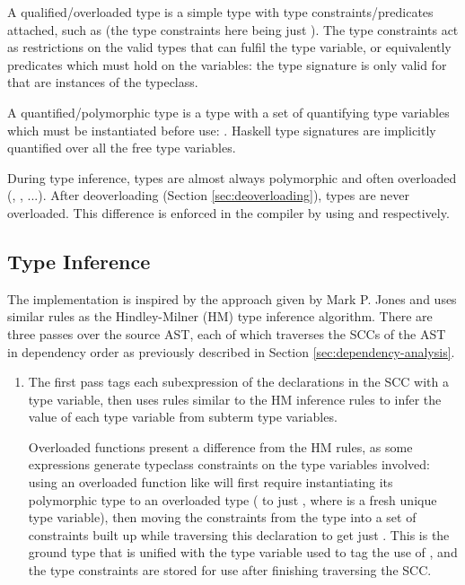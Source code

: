 \documentclass[dissertation.tex]{subfiles}
\begin{document}
{{        A qualified/overloaded type is a simple type with type constraints/predicates attached, such as  (the type constraints here being just ). The type constraints act as restrictions on the valid types that can fulfil the type variable, or equivalently predicates which must hold on the variables: the type signature is only valid for  that are instances of the  typeclass. 

        A quantified/polymorphic type is a type with a set of quantifying type variables which must be instantiated before use: . Haskell type signatures are implicitly quantified over all the free type variables.

        During type inference, types are almost always polymorphic and often overloaded (, , ...). After deoverloading (Section \ref{sec:deoverloading}), types are never overloaded. This difference is enforced in the compiler by using  and  respectively.
    }
    \subsection{Type Inference}
    {
        The implementation is inspired by the approach given by Mark P. Jones\cite{THIH} and uses similar rules as the Hindley-Milner (HM) type inference algorithm. There are three passes over the source AST, each of which traverses the SCCs of the AST in dependency order as previously described in Section \ref{sec:dependency-analysis}.

        \begin{enumerate}
        \item
        {
            The first pass tags each subexpression of the declarations in the SCC with a type variable, then uses rules similar to the HM inference rules to infer the value of each type variable from subterm type variables.
            
            Overloaded functions present a difference from the HM rules, as some expressions generate typeclass constraints on the type variables involved: using an overloaded function like \haskell{(+)} will first require instantiating its polymorphic type to an overloaded type ( to just , where  is a fresh unique type variable), then moving the constraints from the type into a set of constraints built up while traversing this declaration to get just . This is the ground type that is unified with the type variable used to tag the use of \haskell{(+)}, and the type constraints are stored for use after finishing traversing the SCC.

}
\end{enumerate}}}
\end{document}
